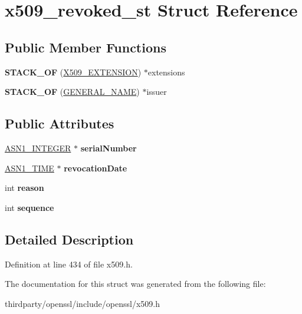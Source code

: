 \hypertarget{structx509__revoked__st}{}\section{x509\+\_\+revoked\+\_\+st Struct Reference}
\label{structx509__revoked__st}
\subsection*{Public Member Functions}
\begin{DoxyCompactItemize}
\item 
\mbox{\label{structx509__revoked__st_ae8a5fc596ad19c4fed74166845e617d9}} 
{\bfseries S\+T\+A\+C\+K\+\_\+\+OF} (\hyperlink{struct_x509__extension__st}{X509\+\_\+\+E\+X\+T\+E\+N\+S\+I\+ON}) $\ast$extensions
\item 
\mbox{\label{structx509__revoked__st_a17a57286f2072be9985608bcfa1be5b1}} 
{\bfseries S\+T\+A\+C\+K\+\_\+\+OF} (\hyperlink{struct_g_e_n_e_r_a_l___n_a_m_e__st}{G\+E\+N\+E\+R\+A\+L\+\_\+\+N\+A\+ME}) $\ast$issuer
\end{DoxyCompactItemize}
\subsection*{Public Attributes}
\begin{DoxyCompactItemize}
\item 
\mbox{\label{structx509__revoked__st_a3b638a3caba10ce8daf6992fdd13658c}} 
\hyperlink{structasn1__string__st}{A\+S\+N1\+\_\+\+I\+N\+T\+E\+G\+ER} $\ast$ {\bfseries serial\+Number}
\item 
\mbox{\label{structx509__revoked__st_a9a86c7c9efcdf5a3289123ea82da8268}} 
\hyperlink{structasn1__string__st}{A\+S\+N1\+\_\+\+T\+I\+ME} $\ast$ {\bfseries revocation\+Date}
\item 
\mbox{\label{structx509__revoked__st_afc9d299c76450dd5f2937000b97795b2}} 
int {\bfseries reason}
\item 
\mbox{\label{structx509__revoked__st_a361a3358c3a578178e6482fc9a28ea86}} 
int {\bfseries sequence}
\end{DoxyCompactItemize}


\subsection{Detailed Description}


Definition at line 434 of file x509.\+h.



The documentation for this struct was generated from the following file\+:\begin{DoxyCompactItemize}
\item 
thirdparty/openssl/include/openssl/x509.\+h\end{DoxyCompactItemize}
